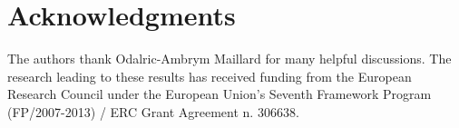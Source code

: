 \documentclass[letterpaper]{article}
\begin{document}

\section*{Acknowledgments}
The authors thank Odalric-Ambrym Maillard for many helpful discussions. The research leading to these results has received funding from the European Research Council under the European Union's Seventh Framework Program (FP/2007-2013) / ERC Grant Agreement n. 306638.

\newpage
\small



\newpage
\normalsize
\onecolumn
\appendix
\end{document}
